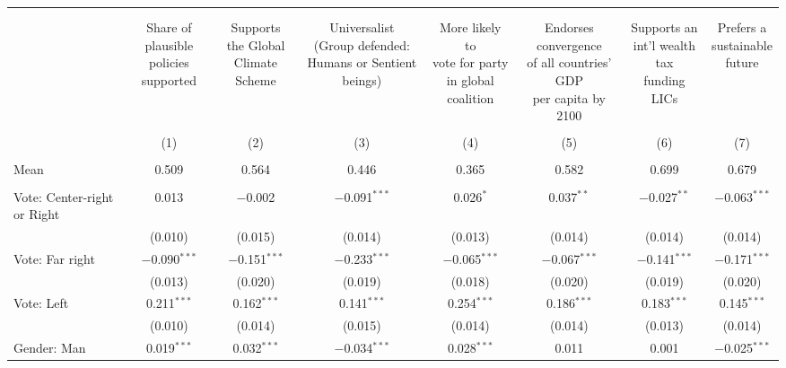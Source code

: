 
\begin{tabular}{@{\extracolsep{5pt}}lccccccc} 
\\[-1.8ex]\hline 
\hline \\[-1.8ex] 
\\[-1.8ex] & \makecell{Share of\\plausible policies\\supported} & \makecell{Supports\\the Global\\Climate Scheme} & \makecell{Universalist\\(Group defended:\\Humans or Sentient beings)} & \makecell{More likely to\\vote for party\\in global coalition} & \makecell{Endorses convergence\\of all countries' GDP\\per capita by 2100} & \makecell{Supports an\\int'l wealth tax\\funding LICs} & \makecell{Prefers a\\sustainable\\future} \\ 
\\[-1.8ex] & (1) & (2) & (3) & (4) & (5) & (6) & (7)\\ 
\hline \\[-1.8ex] 
Mean & 0.509 & 0.564 & 0.446 & 0.365 & 0.582 & 0.699 & 0.679  \\ \hline \\[-1.8ex]
 Vote: Center\mbox{-}right or Right & 0.013 & $-$0.002 & $-$0.091$^{***}$ & 0.026$^{*}$ & 0.037$^{**}$ & $-$0.027$^{**}$ & $-$0.063$^{***}$ \\ 
  & (0.010) & (0.015) & (0.014) & (0.013) & (0.014) & (0.014) & (0.014) \\ 
  Vote: Far right & $-$0.090$^{***}$ & $-$0.151$^{***}$ & $-$0.233$^{***}$ & $-$0.065$^{***}$ & $-$0.067$^{***}$ & $-$0.141$^{***}$ & $-$0.171$^{***}$ \\ 
  & (0.013) & (0.020) & (0.019) & (0.018) & (0.020) & (0.019) & (0.020) \\ 
  Vote: Left & 0.211$^{***}$ & 0.162$^{***}$ & 0.141$^{***}$ & 0.254$^{***}$ & 0.186$^{***}$ & 0.183$^{***}$ & 0.145$^{***}$ \\ 
  & (0.010) & (0.014) & (0.015) & (0.014) & (0.014) & (0.013) & (0.014) \\ 
  Gender: Man & 0.019$^{***}$ & 0.032$^{***}$ & $-$0.034$^{***}$ & 0.028$^{***}$ & 0.011 & 0.001 & $-$0.025$^{***}$ \\ 

\end{tabular}

